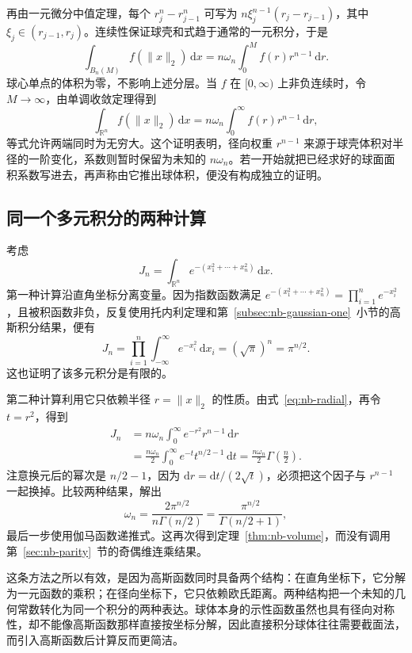 \documentclass[UTF8]{ctexart}
\begin{document}
再由一元微分中值定理，每个 $r_j^n-r_{j-1}^n$ 可写为 $n\xi_j^{n-1}(r_j-r_{j-1})$，其中 $\xi_j\in(r_{j-1},r_j)$。连续性保证球壳和式趋于通常的一元积分，于是
\begin{equation}\label{eq:nb-radial-finite}
  \int_{B_n(M)}f(\|x\|_2)\,\mathrm dx
  =n\omega_n\int_0^M f(r)r^{n-1}\,\mathrm dr.
\end{equation}
球心单点的体积为零，不影响上述分层。当 $f$ 在 $[0,\infty)$ 上非负连续时，令 $M\to\infty$，由单调收敛定理得到
\begin{equation}\label{eq:nb-radial}
  \int_{\mathbb R^n}f(\|x\|_2)\,\mathrm dx
  =n\omega_n\int_0^\infty f(r)r^{n-1}\,\mathrm dr,
\end{equation}
等式允许两端同时为无穷大。这个证明表明，径向权重 $r^{n-1}$ 来源于球壳体积对半径的一阶变化，系数则暂时保留为未知的 $n\omega_n$。若一开始就把已经求好的球面面积系数写进去，再声称由它推出球体积，便没有构成独立的证明。

\subsection{同一个多元积分的两种计算}

考虑
\[
  J_n=\int_{\mathbb R^n}e^{-(x_1^2+\cdots+x_n^2)}\,\mathrm dx.
\]
第一种计算沿直角坐标分离变量。因为指数函数满足 $e^{-(x_1^2+\cdots+x_n^2)}=\prod_{i=1}^n e^{-x_i^2}$，且被积函数非负，反复使用托内利定理和第~\ref{subsec:nb-gaussian-one}~小节的高斯积分结果，便有
\begin{equation}\label{eq:nb-gaussian-cartesian}
  J_n=\prod_{i=1}^n\int_{-\infty}^{\infty}e^{-x_i^2}\,\mathrm dx_i
  =(\sqrt\pi)^n=\pi^{n/2}.
\end{equation}
这也证明了该多元积分是有限的。

第二种计算利用它只依赖半径 $r=\|x\|_2$ 的性质。由式~\eqref{eq:nb-radial}，再令 $t=r^2$，得到
\begin{align*}
  J_n
  &=n\omega_n\int_0^\infty e^{-r^2}r^{n-1}\,\mathrm dr\\
  &=\frac{n\omega_n}{2}\int_0^\infty e^{-t}t^{n/2-1}\,\mathrm dt
    =\frac{n\omega_n}{2}\Gamma\!\left(\frac n2\right).
\end{align*}
注意换元后的幂次是 $n/2-1$，因为 $\mathrm dr=\mathrm dt/(2\sqrt t)$，必须把这个因子与 $r^{n-1}$ 一起换掉。比较两种结果，解出
\[
  \omega_n=\frac{2\pi^{n/2}}{n\Gamma(n/2)}
  =\frac{\pi^{n/2}}{\Gamma(n/2+1)},
\]
最后一步使用伽马函数递推式。这再次得到定理~\ref{thm:nb-volume}，而没有调用第~\ref{sec:nb-parity}~节的奇偶维连乘结果。

这条方法之所以有效，是因为高斯函数同时具备两个结构：在直角坐标下，它分解为一元函数的乘积；在径向坐标下，它只依赖欧氏距离。两种结构把一个未知的几何常数转化为同一个积分的两种表达。球体本身的示性函数虽然也具有径向对称性，却不能像高斯函数那样直接按坐标分解，因此直接积分球体往往需要截面法，而引入高斯函数后计算反而更简洁。
\end{document}
